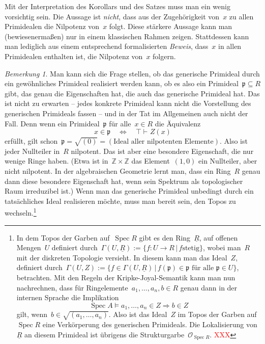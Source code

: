 \documentclass[a4paper,ngerman,12pt]{scrartcl}
\theoremstyle{definition}
\theoremstyle{plain}
\theoremstyle{remark}
\newtheorem{bem}[defn]{Bemerkung}
\newcommand{\ZZ}{\mathbb{Z}}
\newcommand{\pp}{\mathfrak{p}}
\renewcommand{\O}{\mathcal{O}}
\newcommand{\ul}[1]{\underline{#1}}
\DeclareMathOperator{\Spec}{Spec}
\newcommand{\seq}[1]{\mathrel{\vdash\!\!\!_{#1}}}
\renewcommand{\_}{\mathpunct{.}\,}
\newcommand{\?}{\,{:}\,}
\newcommand{\XXX}[1]{\textcolor{red}{#1}}
\begin{document}
Mit der Interpretation des Korollars und des Satzes muss man ein wenig
vorsichtig sein. Die Aussage ist \emph{nicht}, dass aus der Zugehörigkeit
von~$x$ zu allen Primidealen die Nilpotenz von~$x$ folgt. Diese stärkere
Aussage kann man (bewiesenermaßen) nur in einem klassischen Rahmen zeigen.
Stattdessen kann man lediglich aus einem entsprechend formalisierten
\emph{Beweis}, dass~$x$ in allen Primidealen enthalten ist, die Nilpotenz
von~$x$ folgern.

\begin{bem}
Man kann sich die Frage stellen, ob das generische Primideal durch ein
gewöhnliches Primideal realisiert werden kann, ob es also ein Primideal~$\pp
\subseteq R$ gibt, das genau die Eigenschaften hat, die auch das generische
Primideal hat. Das ist nicht zu erwarten -- jedes konkrete Primideal kann nicht
die Vorstellung des generischen Primideals fassen -- und in der Tat im
Allgemeinen auch nicht der Fall. Denn wenn ein Primideal~$\pp$ für alle~$x \in
R$ die Äquivalenz
\[ x \in \pp \quad\Longleftrightarrow\quad \top \seq{} Z(x) \]
erfüllt, gilt schon~$\pp = \sqrt{(0)} = (\text{Ideal aller nilpotenten
Elemente})$. Also ist jeder Nullteiler in~$R$ nilpotent. Das ist aber eine
besondere Eigenschaft, die nur wenige Ringe haben. (Etwa ist in~$\ZZ \times
\ZZ$ das Element~$(1,0)$ ein Nullteiler, aber nicht nilpotent. In der
algebraischen Geometrie lernt man, dass ein Ring~$R$ genau dann diese besondere
Eigenschaft hat, wenn sein Spektrum als topologischer Raum irreduzibel ist.)
Wenn man das generische Primideal unbedingt durch ein tatsächliches Ideal
realisieren möchte, muss man bereit sein, den Topos zu wechseln.\footnote{In dem
Topos der Garben auf~$\Spec R$ gibt es den Ring~$\ul{R}$, auf offenen
Mengen~$U$ definiert durch~$\Gamma(U,\ul{R}) := \{ f : U \to R \,|\, \text{$f$
stetig} \}$, wobei man~$R$ mit der diskreten Topologie versieht. In diesem kann
man das Ideal~$Z$, definiert durch~$\Gamma(U,Z) := \{ f \in
\Gamma(U,\ul{R}) \,|\, \text{$f(\pp) \in \pp$ für alle~$\pp \in U$} \}$,
betrachten. Mit den Regeln der Kripke-Joyal-Semantik kann man nun nachrechnen,
dass für Ringelemente~$a_1,\ldots,a_n, b \in R$ genau dann in der internen
Sprache die Implikation
\[ \Spec A \models a_1,\ldots,a_n \in Z \Rightarrow b \in Z \]
gilt, wenn~$b \in \sqrt{(a_1,\ldots,a_n)}$. Also ist das Ideal~$Z$ im Topos der
Garben auf~$\Spec R$ eine Verkörperung des generischen Primideals. Die
Lokalisierung von~$\ul{R}$ an diesem Primideal ist übrigens die
Strukturgarbe~$\O_{\Spec R}$. \XXX{XXX}}
\end{bem}
\end{document}

